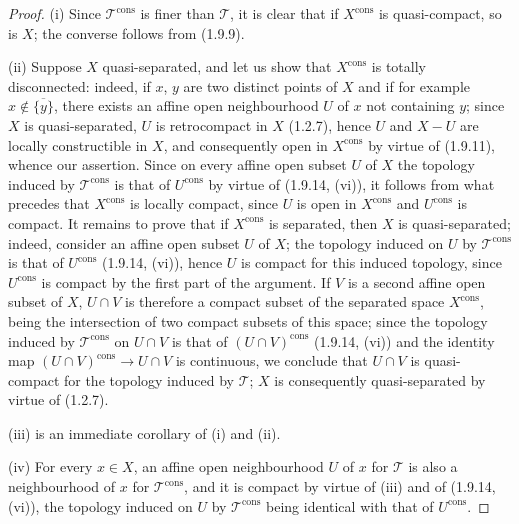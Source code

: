 \begin{proof}
(i) Since $\mathscr T^{\mathrm{cons}}$ is finer than $\mathscr T$, it is
clear that if $X^{\mathrm{cons}}$ is quasi-compact, so is $X$;
the converse follows from (1.9.9).

(ii) Suppose $X$ quasi-separated, and let us show that $X^{\mathrm{cons}}$ is
totally disconnected: indeed, if $x$, $y$ are two distinct points of
$X$ and if for example $x\notin\overline{\{y\}}$, there exists an
affine open neighbourhood $U$ of $x$ not containing $y$; since $X$ is
quasi-separated, $U$ is retrocompact in $X$ (1.2.7), hence $U$ and $X-U$ are
locally constructible in $X$, and consequently open in
$X^{\mathrm{cons}}$ by virtue of (1.9.11), whence our assertion. Since on
every affine open subset $U$ of $X$ the topology induced by
$\mathscr T^{\mathrm{cons}}$ is that of $U^{\mathrm{cons}}$ by virtue of
(1.9.14, (vi)), it follows from what precedes that $X^{\mathrm{cons}}$ is
locally compact, since $U$ is open in $X^{\mathrm{cons}}$ and
$U^{\mathrm{cons}}$ is compact. It remains to prove that if
$X^{\mathrm{cons}}$ is separated, then $X$ is quasi-separated; indeed,
consider an affine open subset $U$ of $X$; the topology induced on
$U$ by $\mathscr T^{\mathrm{cons}}$ is that of $U^{\mathrm{cons}}$
(1.9.14, (vi)), hence $U$ is compact for this induced topology, since
$U^{\mathrm{cons}}$ is compact by the first part of the argument. If
$V$ is a second affine open subset of $X$, $U\cap V$ is therefore a compact
subset of the separated space $X^{\mathrm{cons}}$, being the intersection of
two compact subsets of this space; since the topology induced by
$\mathscr T^{\mathrm{cons}}$ on $U\cap V$ is that of
$(U\cap V)^{\mathrm{cons}}$ (1.9.14, (vi)) and the identity map
$(U\cap V)^{\mathrm{cons}}\to U\cap V$ is continuous, we conclude that
$U\cap V$ is quasi-compact for the topology induced by $\mathscr T$; $X$
is consequently quasi-separated by virtue of (1.2.7).

(iii) is an immediate corollary of (i) and (ii).

(iv) For every $x\in X$, an affine open neighbourhood $U$ of $x$ for
$\mathscr T$ is also a neighbourhood of $x$ for $\mathscr T^{\mathrm{cons}}$,
and it is compact by virtue of (iii) and of (1.9.14, (vi)), the topology
induced on $U$ by $\mathscr T^{\mathrm{cons}}$ being identical with that of
$U^{\mathrm{cons}}$.


\end{proof}
